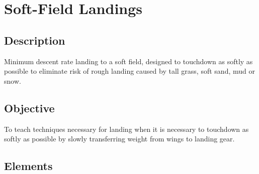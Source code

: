 \section{Soft-Field Landings}

\subsection{Description}

Minimum descent rate landing to a soft field, designed to touchdown as softly
as possible to eliminate risk of rough landing caused by tall grass, soft sand,
mud or snow.

\subsection{Objective}

To teach techniques necessary for landing when it is necessary to touchdown as
softly as possible by slowly transferring weight from wings to landing gear.

\subsection{Elements}

